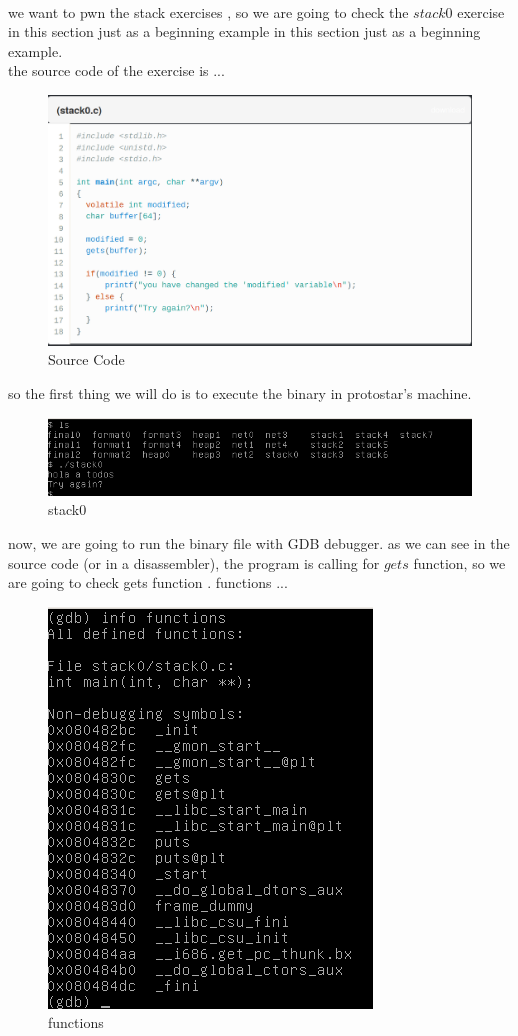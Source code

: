 \documentclass[10pt,a4paper]{article} %
\begin{document}
            \\ we want to pwn the stack exercises , so we are going to check
            the $ stack0  $ exercise in this section just as a beginning
            example  in this section just as a beginning example.
            \\ the source code of the exercise is ...
            \begin{figure}[h!]
                \centering
                \includegraphics[width=0.5\linewidth]{source.png}
                \caption{Source Code}
                \label{fig:source}
            \end{figure}
            so the first thing we will do is to execute the binary in
            protostar's machine.
            \begin{figure}[h!]
                \centering
                \includegraphics[width=0.5\linewidth]{stack0}
                \caption{stack0}
                \label{fig:stack0}
            \end{figure}
            \newpage
            now, we are going to run the binary file with GDB debugger. as we
            can see in the source code (or in a disassembler), the program is calling for $ gets  $
            function, so we are going to check gets function .
            functions ...
            \begin{figure}[h!]
                \centering
                \includegraphics[width=0.5\linewidth]{protofun}
                \caption{functions }
                \label{fig:protofun}
            \end{figure}
\end{document}
